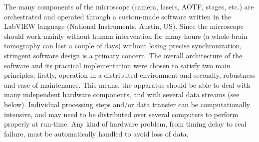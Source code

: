 \documentclass[12pt]{spieman}  %
\begin{document}
The many components of the microscope (camera, lasers, AOTF, stages, etc.) are orchestrated and operated through a custom-made software written in the LabVIEW language (National Instruments, Austin, US). Since the microscope should work mainly without human intervention for many hours (a whole-brain tomography can last a couple of days) without losing precise synchronization, stringent software design is a primary concern. The overall architecture of the software and its practical implementation were chosen to satisfy two main principles; firstly, operation in a distributed environment and secondly, robustness and ease of maintenance. This means, the apparatus should be able to deal with many independent hardware components, and with several data streams (see below). Individual processing steps and/or data transfer can be computationally intensive, and may need to be distributed over several computers to perform properly at run-time. Any kind of hardware problem, from timing delay to real failure, must be automatically handled to avoid loss of data.

\end{document}

